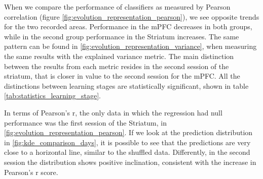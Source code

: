     
    When we compare the performance of classifiers as measured by Pearson correlation (figure \ref{fig:evolution_representation_pearson}), we see opposite trends for the two recorded areas. Performance in the mPFC decreases in both groups, while in the second group performance in the Striatum increases. The same pattern can be found in \ref{fig:evolution_representation_variance}, when measuring the same results with the explained variance metric. The main distinction between the results from each metric resides in the second session of the striatum, that is closer in value to the second session for the mPFC. All the distinctions between learning stages are statistically significant, shown in table \ref{tab:statistics_learning_stage}. 
    
    In terms of Pearson's r, the only data in which the regression had null performance was the first session of the Striatum, in \ref{fig:evolution_representation_pearson}. If we look at the prediction distribution in \ref{fig:kde_comparison_days}, it is possible to see that the predictions are very close to a horizontal line, similar to the shuffled data. Differently, in the second session the distribution shows positive inclination, consistent with the increase in Pearson's r score.


